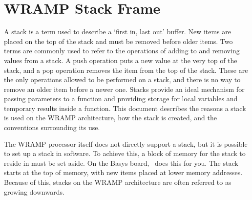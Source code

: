 %
%
\section{WRAMP Stack Frame}

A stack is a term used to describe a `first in, last out' buffer. New
items are placed on the top of the stack and must be removed before
older items. Two terms are commonly used to refer to the operations of
adding to and removing values from a stack. A push operation puts a
new value at the very top of the stack, and a pop operation removes the
item from the top of the stack. These are the only operations allowed to
be performed on a stack, and there is no way to remove an older item
before a newer one. Stacks provide an ideal mechanism for passing
parameters to a function and providing storage for local variables and
temporary results inside a function. This document describes the
reasons a stack is used on the WRAMP architecture, how the stack is
created, and the conventions surrounding its use.

The WRAMP processor itself does not directly support a stack, but
it is possible to set up a stack in software. To achieve this, a block
of memory for the stack to reside in must be set aside. On the Basys
board, \WRAMPmon\ does this for you. The stack starts at the top of
memory, with new items placed at lower memory addresses. Because of
this, stacks on the WRAMP architecture are often referred to as
growing downwards.

